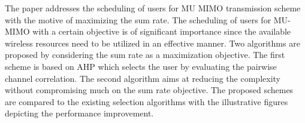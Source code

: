 The paper addresses the scheduling of users for \ac{MU} \ac{MIMO} transmission scheme with the motive of maximizing the sum rate. The scheduling of users for MU-MIMO with a certain objective is of significant importance since the available wireless resources need to be utilized in an effective manner. Two algorithms are proposed by considering the sum rate as a maximization objective. The first scheme is based on \ac{AHP} which selects the user by evaluating the pairwise channel correlation. The second algorithm aims at reducing the complexity without compromising much on the sum rate objective. The proposed schemes are compared to the existing selection algorithms with the illustrative figures depicting the performance improvement.
